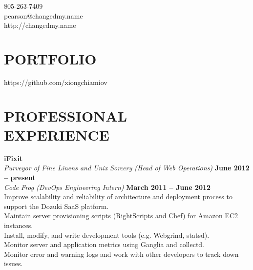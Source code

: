 \documentclass[margin,line]{resume}
\begin{document}
{
    \sc
    \hfill 805-263-7409                   \vspace{0mm}\\\vspace{0mm}%
    \hfill pearson@changedmy.name         \vspace{0mm}\\\vspace{0mm}%
    \hfill http://changedmy.name          \vspace{0mm}\\\vspace{-9mm}%
}

\begin{resume}

\vspace{6mm}

    \section{\mysidestyle \textbf{\large{P}\small{ORTFOLIO}}}

    https://github.com/xiongchiamiov

\sectionline

    \section{\mysidestyle \textbf{\large{P}\small{ROFESSIONAL\\EXPERIENCE}}}

    \textbf{\listing iFixit} \vspace{2mm}\\\vspace{1mm}%
    \textsl{Purveyor of Fine Linens and Unix Sorcery (Head of Web Operations)} \hfill \textbf{June 2012 -- present}\\
    \textsl{Code Frog (DevOps Engineering Intern)} \hfill \textbf{March 2011 -- June 2012}\\
    Improve scalability and reliability of architecture and deployment process to support the Dozuki SaaS platform.\\
    Maintain server provisioning scripts (RightScripts and Chef) for Amazon EC2 instances.\\
    Install, modify, and write development tools (e.g. Webgrind, statsd).\\
    Monitor server and application metrics using Ganglia and collectd.\\
    Monitor error and warning logs and work with other developers to track down issues.


\end{resume}
\end{document}
